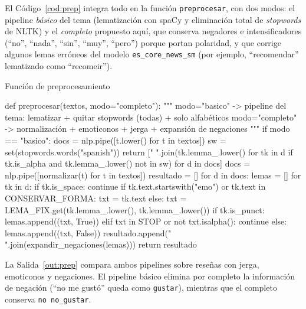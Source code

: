 \documentclass[11pt,letterpaper]{article}
\begin{document}
El Código~\ref{cod:prep} integra todo en la función \texttt{preprocesar}, con dos modos: el pipeline \textit{básico} del tema (lematización con spaCy y eliminación total de \textit{stopwords} de NLTK) y el \textit{completo} propuesto aquí, que conserva negadores e intensificadores (``no'', ``nada'', ``sin'', ``muy'', ``pero'') porque portan polaridad, y que corrige algunos lemas erróneos del modelo \texttt{es\_core\_news\_sm} (por ejemplo, ``recomendar'' lematizado como ``recomeir'').

\begin{codigo}[label=cod:prep]{Función de preprocesamiento}

def preprocesar(textos, modo="completo"):
    """
    modo="basico"   -> pipeline del tema: lematizar + quitar stopwords (todas) + solo alfabéticos
    modo="completo" -> normalización + emoticonos + jerga + expansión de negaciones
    """
    if modo == "basico":
        docs = nlp.pipe([t.lower() for t in textos])
        sw = set(stopwords.words("spanish"))
        return [" ".join(tk.lemma_.lower() for tk in d
                         if tk.is_alpha and tk.lemma_.lower() not in sw) for d in docs]
    docs = nlp.pipe([normalizar(t) for t in textos])
    resultado = []
    for d in docs:
        lemas = []
        for tk in d:
            if tk.is_space:
                continue
            if tk.text.startswith("emo") or tk.text in CONSERVAR_FORMA:
                txt = tk.text
            else:
                txt = LEMA_FIX.get(tk.lemma_.lower(), tk.lemma_.lower())
            if tk.is_punct:
                lemas.append((txt, True))
            elif txt in STOP or not txt.isalpha():
                continue
            else:
                lemas.append((txt, False))
        resultado.append(" ".join(expandir_negaciones(lemas)))
    return resultado
\end{codigo}

La Salida~\ref{out:prep} compara ambos pipelines sobre reseñas con jerga, emoticonos y negaciones. El pipeline básico elimina por completo la información de negación (``no me gustó'' queda como \texttt{gustar}), mientras que el completo conserva \texttt{no no\_gustar}.
\end{document}
